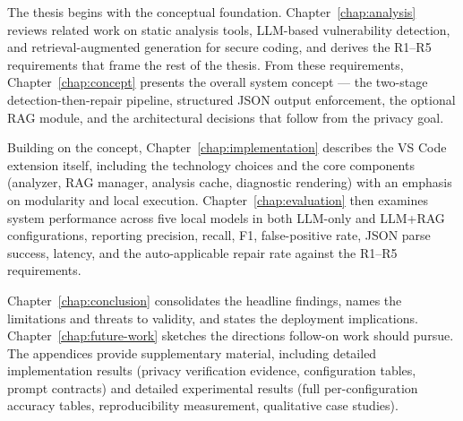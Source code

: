The thesis begins with the conceptual foundation. Chapter~\ref{chap:analysis} reviews related work on static analysis tools, LLM-based vulnerability detection, and retrieval-augmented generation for secure coding, and derives the R1--R5 requirements that frame the rest of the thesis. From these requirements, Chapter~\ref{chap:concept} presents the overall system concept --- the two-stage detection-then-repair pipeline, structured JSON output enforcement, the optional RAG module, and the architectural decisions that follow from the privacy goal.

Building on the concept, Chapter~\ref{chap:implementation} describes the VS Code extension itself, including the technology choices and the core components (analyzer, RAG manager, analysis cache, diagnostic rendering) with an emphasis on modularity and local execution. Chapter~\ref{chap:evaluation} then examines system performance across five local models in both LLM-only and LLM+RAG configurations, reporting precision, recall, F1, false-positive rate, JSON parse success, latency, and the auto-applicable repair rate against the R1--R5 requirements.

Chapter~\ref{chap:conclusion} consolidates the headline findings, names the limitations and threats to validity, and states the deployment implications. Chapter~\ref{chap:future-work} sketches the directions follow-on work should pursue. The appendices provide supplementary material, including detailed implementation results (privacy verification evidence, configuration tables, prompt contracts) and detailed experimental results (full per-configuration accuracy tables, reproducibility measurement, qualitative case studies).
